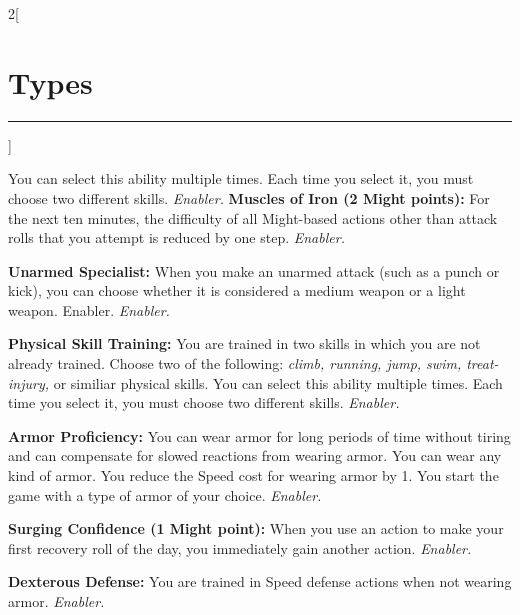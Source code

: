 \documentclass[a4paper,10pt,final]{book}
\newcommand{\HRule}{\rule{\linewidth}{0.5mm}} %
\newcommand{\newSection}[1]{\section*{#1} \addcontentsline{toc}{section}{#1} \label{sec:#1} \HRule}
\newcommand{\itemAbility}[2]{\textcolor{25gray}{\textbullet\textbf{ #1:}} {#2}\par}
\newcommand{\enabler}{\textit{ Enabler.}}
\newenvironment{docsection}[1]
{
  \begin{multicols*}{2}[\newSection{#1}]
}
{
  \end{multicols*}
  \newpage
}
\begin{document}
\begin{docsection}{Types}
{You can select this ability multiple times. Each time you select it, you
must choose two different skills.\enabler}
\itemAbility{Muscles of Iron (2 Might points)}{For the
next ten minutes, the difficulty of all Might-based
actions other than attack rolls that
you attempt is reduced by one step.\enabler}
\itemAbility{Unarmed Specialist}{When you make
an unarmed attack (such as a punch
or kick), you can choose whether it is considered a medium weapon or a light
weapon. Enabler.\enabler}
\itemAbility{Physical Skill Training}{You are trained in two
skills in which you are not already trained.
Choose two of the following: \textit{climb, running, jump, swim, treat-injury,} or similiar physical skills.
You can select this ability multiple times.
Each time you select it, you must choose
two different skills.\enabler} 
\itemAbility{Armor Proficiency}{You can wear armor
for long periods of time without tiring
and can compensate for slowed reactions
from wearing armor. You can wear any kind
of armor. You reduce the Speed cost for
wearing armor by 1. You start the game with
a type of armor of your choice.\enabler}
\itemAbility{Surging Confidence (1 Might point)}{When you use an action to make your first
recovery roll of the day, you immediately
gain another action.\enabler}
\itemAbility{Dexterous Defense}{You are trained
in Speed defense actions when not wearing
armor.\enabler}


\end{docsection}
\end{document}
